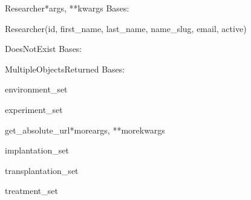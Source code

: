 \documentclass[letterpaper,10pt,english]{sphinxmanual}
\begin{document}
\hypertarget{data.models.Researcher}{}\begin{classdesc}{Researcher}{*args, **kwargs}
Bases: 

Researcher(id, first\_name, last\_name, name\_slug, email, active)

\hypertarget{data.models.Researcher.DoesNotExist}{}\begin{excdesc}{DoesNotExist}
Bases: 
\end{excdesc}

\hypertarget{data.models.Researcher.MultipleObjectsReturned}{}\begin{excdesc}{MultipleObjectsReturned}
Bases: 
\end{excdesc}

\hypertarget{data.models.Researcher.environment_set}{}\begin{memberdesc}[Researcher]{environment\_set}\end{memberdesc}

\hypertarget{data.models.Researcher.experiment_set}{}\begin{memberdesc}[Researcher]{experiment\_set}\end{memberdesc}

\hypertarget{data.models.Researcher.get_absolute_url}{}\begin{methoddesc}[Researcher]{get\_absolute\_url}{*moreargs, **morekwargs}\end{methoddesc}

\hypertarget{data.models.Researcher.implantation_set}{}\begin{memberdesc}[Researcher]{implantation\_set}\end{memberdesc}

\hypertarget{data.models.Researcher.transplantation_set}{}\begin{memberdesc}[Researcher]{transplantation\_set}\end{memberdesc}

\hypertarget{data.models.Researcher.treatment_set}{}\begin{memberdesc}[Researcher]{treatment\_set}\end{memberdesc}
\end{classdesc}
\end{document}
